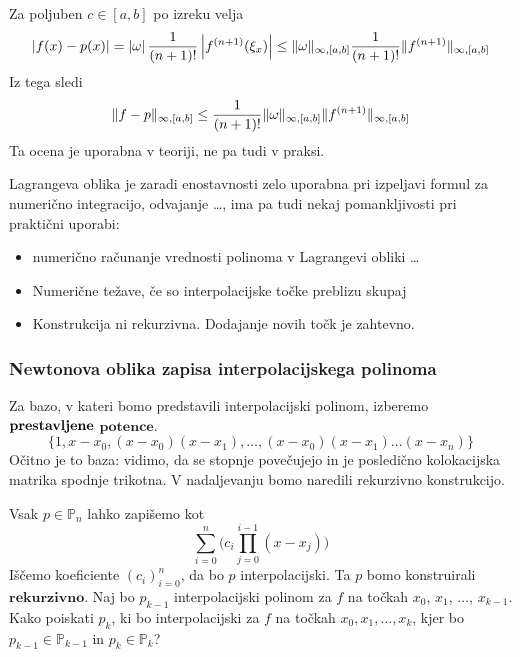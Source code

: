 \documentclass[a4paper,12pt]{article}
\DeclarePairedDelimiter\norm{\lVert}{\rVert}
\theoremstyle{definition}
\theoremstyle{remark}
\newcommand{\Pp}{\mathbb{P}}
\begin{document}
Za poljuben $c \in [a, b]$ po izreku velja
\begin{equation*}
    \left| f(x) - p(x) \right| = \left| \omega \right| \frac{1}{(n+1)!} \left| f^{(n+1)}(\xi_x) \right| \leq \norm{\omega}_{\infty, [a, b]} \frac{1}{(n+1)!} \norm{f^{(n+1)}}_{\infty, [a, b]}
\end{equation*}
Iz tega sledi
\begin{equation*}
    \norm{f - p}_{\infty, [a, b]} \leq \frac{1}{(n+1)!} \norm{\omega}_{\infty, [a, b]} \norm{f^{(n+1)}}_{\infty, [a, b]}
\end{equation*}
Ta ocena je uporabna v teoriji, ne pa tudi v praksi.

Lagrangeva oblika je zaradi enostavnosti zelo uporabna pri izpeljavi formul za numerično integracijo, odvajanje \dots, ima pa tudi nekaj pomankljivosti pri praktični uporabi:
\begin{itemize}
    \item numerično računanje vrednosti polinoma v Lagrangevi obliki \dots
    \item Numerične težave, če so interpolacijske točke preblizu skupaj
    \item Konstrukcija ni rekurzivna. Dodajanje novih točk je zahtevno.
\end{itemize}

\subsubsection{Newtonova oblika zapisa interpolacijskega polinoma}
Za bazo, v kateri bomo predstavili interpolacijski polinom, izberemo $\\ \textbf{prestavljene}$ $\textbf{potence}$. %
\begin{equation*}
    \{1, x-x_0, (x-x_0)(x-x_1), \dots, (x-x_0) (x-x_1) \dots (x-x_n)\}
\end{equation*}
Očitno je to baza: vidimo, da se stopnje povečujejo in je posledično kolokacijska matrika spodnje trikotna. V nadaljevanju bomo naredili rekurzivno konstrukcijo.

Vsak $p \in \Pp_n$ lahko zapišemo kot 
\begin{equation*}
    \sum_{i = 0}^{n} \bigl( c_i \prod_{j = 0}^{i-1} (x-x_j) \bigr)
\end{equation*}
Iščemo koeficiente $(c_i)_{i=0}^n$, da bo $p$ interpolacijski.
Ta $p$ bomo konstruirali $\textbf{rekurzivno}$.
Naj bo $p_{k-1}$ interpolacijski polinom za $f$ na točkah $x_0$, $x_1$, $\dots$, $x_{k-1}$. Kako poiskati $p_k$, ki bo interpolacijski za $f$ na točkah
$x_0, x_1, \dots, x_k$, kjer bo $p_{k-1} \in \Pp_{k-1} \text{ in } p_k \in \Pp_k$?
\end{document}

